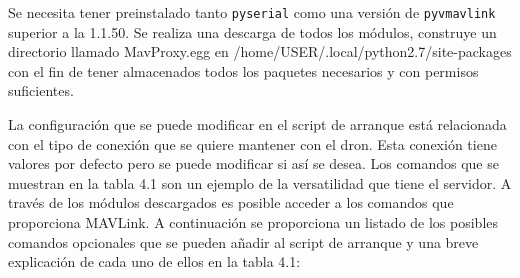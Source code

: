 Se necesita tener preinstalado tanto \texttt{pyserial} como una versión de \texttt{pyvmavlink} superior a la 1.1.50. Se realiza una descarga de todos los módulos, construye un directorio llamado MavProxy.egg en /home/USER/.local/python2.7/site-packages con el fin de tener almacenados todos los paquetes necesarios y con permisos suficientes. 

La configuración que se puede modificar en el script de arranque está relacionada con el tipo de conexión que se quiere mantener con el dron. Esta conexión tiene valores por defecto pero se puede modificar si así se desea. Los comandos que se muestran en la tabla 4.1 son un ejemplo de la versatilidad que tiene el servidor. A través de los módulos descargados es posible acceder a los comandos que proporciona MAVLink. A continuación se proporciona un listado de los posibles comandos opcionales que se pueden añadir al script de arranque y una breve explicación de cada uno de ellos en la tabla 4.1:

